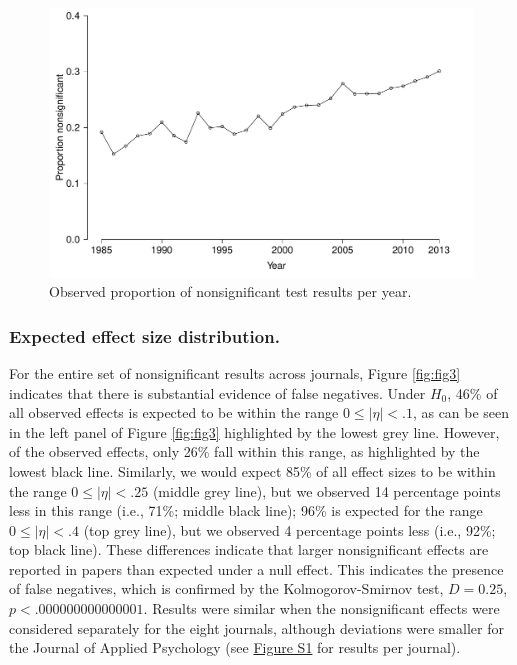 \documentclass{article}
\begin{document}
\begin{figure}
\begin{center}
\includegraphics{../figures/Fig2.pdf}
\end{center}
\caption{Observed proportion of nonsignificant test results per year.}
\label{fig:fig2}
\end{figure}

\subsubsection*{Expected effect size distribution.}


For the entire set of nonsignificant results across journals, Figure \ref{fig:fig3} indicates that there is substantial evidence of false negatives. Under $H_0$, 46\% of all observed effects is expected to be within the range $0\leq|\eta|<.1$, as can be seen in the left panel of Figure \ref{fig:fig3} highlighted by the lowest grey line. However, of the observed effects, only 26\% fall within this range, as highlighted by the lowest black line. Similarly, we would expect 85\% of all effect sizes to be within the range $0\leq|\eta|<.25$ (middle grey line), but we observed 14 percentage points less in this range (i.e., 71\%; middle black line); 96\% is expected for the range $0\leq|\eta|<.4$ (top grey line), but we observed 4 percentage points less (i.e., 92\%; top black line). These differences indicate that larger nonsignificant effects are reported in papers than expected under a null effect. This indicates the presence of false negatives, which is confirmed by the Kolmogorov-Smirnov test, $D=0.25$, $p<.000000000000001$. Results were similar when the nonsignificant effects were considered separately for the eight journals, although deviations were smaller for the Journal of Applied Psychology (see \href{../figures/S1Fig}{Figure S1} for results per journal).
\end{document}
